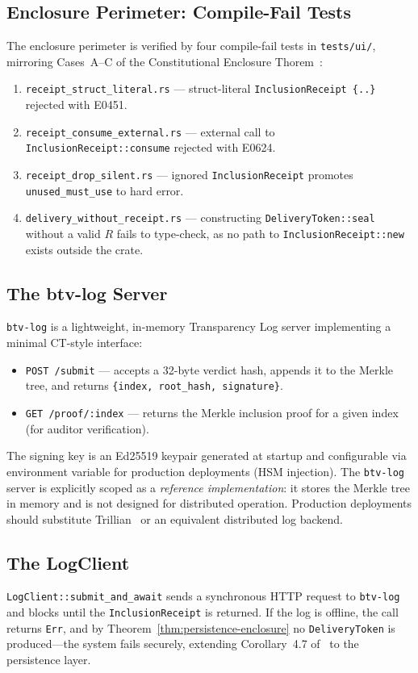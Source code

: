 \subsection{Enclosure Perimeter: Compile-Fail Tests}

The enclosure perimeter is verified by four compile-fail tests in
\texttt{tests/ui/}, mirroring Cases~A--C of the Constitutional Enclosure
Thorem~\cite{btv2026}:

\begin{enumerate}
  \item \texttt{receipt\_struct\_literal.rs} --- struct-literal
  \texttt{InclusionReceipt~\{..\}} rejected with E0451.
  \item \texttt{receipt\_consume\_external.rs} --- external call to
  \texttt{InclusionReceipt::consume} rejected with E0624.
  \item \texttt{receipt\_drop\_silent.rs} --- ignored \texttt{InclusionReceipt}
  promotes \texttt{unused\_must\_use} to hard error.
  \item \texttt{delivery\_without\_receipt.rs} --- constructing
  \texttt{DeliveryToken::seal} without a valid $R$ fails to type-check,
  as no path to \texttt{InclusionReceipt::new} exists outside the crate.
\end{enumerate}

\subsection{The btv-log Server}

\texttt{btv-log} is a lightweight, in-memory Transparency Log server
implementing a minimal CT-style interface:

\begin{itemize}
  \item \texttt{POST /submit} --- accepts a 32-byte verdict hash, appends it to
  the Merkle tree, and returns
  \texttt{\{index, root\_hash, signature\}}.
  \item \texttt{GET /proof/:index} --- returns the Merkle inclusion proof for
  a given index (for auditor verification).
\end{itemize}

The signing key is an Ed25519 keypair generated at startup and configurable
via environment variable for production deployments (HSM injection).
The \texttt{btv-log} server is explicitly scoped as a \emph{reference
implementation}: it stores the Merkle tree in memory and is not designed for
distributed operation. Production deployments should substitute Trillian~\cite{trillian}
or an equivalent distributed log backend.

\subsection{The LogClient}

\texttt{LogClient::submit\_and\_await} sends a synchronous HTTP request to
\texttt{btv-log} and blocks until the \texttt{InclusionReceipt} is returned.
If the log is offline, the call returns \texttt{Err}, and by Theorem~\ref{thm:persistence-enclosure}
no \texttt{DeliveryToken} is produced---the system fails securely, extending
Corollary~4.7 of~\cite{btv2026} to the persistence layer.

